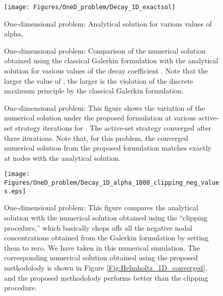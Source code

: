 \documentclass[11pt]{amsart}
\begin{document}
\begin{figure}[htp]
  \centering
  \texttt{[image: Figures/OneD\_problem/Decay\_1D\_exactsol]}
  \caption{One-dimensional problem: Analytical solution for various 
  values of alpha.} \label{Fig:TransientDMP_1D_exactsol}
\end{figure}

\begin{figure}[!h]
  \centering
  \caption{One-dimensional problem: Comparison of the numerical solution obtained 
  using the classical Galerkin formulation with the analytical solution for various 
  values of the decay coefficient . Note that the larger the value of , 
  the larger is the violation of the discrete maximum principle by the classical 
  Galerkin formulation.} 
  \label{Fig:Decay_1D_various_alpha}
\end{figure}

\begin{figure}[!h]
  \centering
  \caption{One-dimensional problem: This figure shows the variation of the numerical 
    solution under the proposed formulation at various active-set strategy iterations 
    for . The active-set strategy converged after three iterations. Note 
    that, for this problem, the converged numerical solution from the proposed formulation 
    matches exactly at nodes with the analytical solution.} 
    \label{fig:Helmholtz_1D_NonNeg_iters}
\end{figure}

\begin{figure}
  \texttt{[image: Figures/OneD\_problem/Decay\_1D\_alpha\_1000\_clipping\_neg\_values.eps]}
  \caption{One-dimensional problem: This figure compares the analytical solution 
    with the numerical solution obtained using the ``clipping procedure,'' which 
    basically chops offs all the negative nodal concentrations obtained from the 
    Galerkin formulation by setting them to zero. We have taken  
    in this numerical simulation. The corresponding numerical solution obtained 
    using the proposed methodolody is shown in Figure \ref{Fig:Helmholtz_1D_converged}, 
    and the proposed methodolody performs better than the clipping procedure.} 
  \label{Fig:Helmholtz_1D_clipping}
\end{figure}
\end{document}
